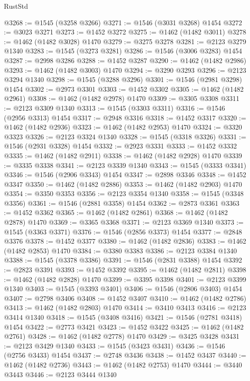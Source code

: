 \begin{lexlean}{RustStd}
\begin{coremodule}
@3268 := @1545 (@3258 @3266)
@3271 := @1546 (@3031 @3268) @1454
@3272 := @3023 @3271
@3273 := @1452 @3272
@3275 := @1462 (@1482 @3011)
@3278 := @1462 (@1482 @3028) @1470
@3279 := @3275 @3278
@3281 := @2123 @3279 @1340
@3283 := @1545 (@3273 @3281)
@3286 := @1546 (@3006 @3283) @1454
@3287 := @2998 @3286
@3288 := @1452 @3287
@3290 := @1462 (@1482 @2986)
@3293 := @1462 (@1482 @3003) @1470
@3294 := @3290 @3293
@3296 := @2123 @3294 @1340
@3298 := @1545 (@3288 @3296)
@3301 := @1546 (@2981 @3298) @1454
@3302 := @2973 @3301
@3303 := @1452 @3302
@3305 := @1462 (@1482 @2961)
@3308 := @1462 (@1482 @2978) @1470
@3309 := @3305 @3308
@3311 := @2123 @3309 @1340
@3313 := @1545 (@3303 @3311)
@3316 := @1546 (@2956 @3313) @1454
@3317 := @2948 @3316
@3318 := @1452 @3317
@3320 := @1462 (@1482 @2936)
@3323 := @1462 (@1482 @2953) @1470
@3324 := @3320 @3323
@3326 := @2123 @3324 @1340
@3328 := @1545 (@3318 @3326)
@3331 := @1546 (@2931 @3328) @1454
@3332 := @2923 @3331
@3333 := @1452 @3332
@3335 := @1462 (@1482 @2911)
@3338 := @1462 (@1482 @2928) @1470
@3339 := @3335 @3338
@3341 := @2123 @3339 @1340
@3343 := @1545 (@3333 @3341)
@3346 := @1546 (@2906 @3343) @1454
@3347 := @2898 @3346
@3348 := @1452 @3347
@3350 := @1462 (@1482 @2886)
@3353 := @1462 (@1482 @2903) @1470
@3354 := @3350 @3353
@3356 := @2123 @3354 @1340
@3358 := @1545 (@3348 @3356)
@3361 := @1546 (@2881 @3358) @1454
@3362 := @2873 @3361
@3363 := @1452 @3362
@3365 := @1462 (@1482 @2861)
@3368 := @1462 (@1482 @2878) @1470
@3369 := @3365 @3368
@3371 := @2123 @3369 @1340
@3373 := @1545 (@3363 @3371)
@3376 := @1546 (@2856 @3373) @1454
@3377 := @2848 @3376
@3378 := @1452 @3377
@3380 := @1462 (@1482 @2836)
@3383 := @1462 (@1482 @2853) @1470
@3384 := @3380 @3383
@3386 := @2123 @3384 @1340
@3388 := @1545 (@3378 @3386)
@3391 := @1546 (@2831 @3388) @1454
@3392 := @2823 @3391
@3393 := @1452 @3392
@3395 := @1462 (@1482 @2811)
@3398 := @1462 (@1482 @2828) @1470
@3399 := @3395 @3398
@3401 := @2123 @3399 @1340
@3403 := @1545 (@3393 @3401)
@3406 := @1546 (@2806 @3403) @1454
@3407 := @2798 @3406
@3408 := @1452 @3407
@3410 := @1462 (@1482 @2786)
@3413 := @1462 (@1482 @2803) @1470
@3414 := @3410 @3413
@3416 := @2123 @3414 @1340
@3418 := @1545 (@3408 @3416)
@3421 := @1546 (@2781 @3418) @1454
@3422 := @2773 @3421
@3423 := @1452 @3422
@3425 := @1462 (@1482 @2761)
@3428 := @1462 (@1482 @2778) @1470
@3429 := @3425 @3428
@3431 := @2123 @3429 @1340
@3433 := @1545 (@3423 @3431)
@3436 := @1546 (@2756 @3433) @1454
@3437 := @2748 @3436
@3438 := @1452 @3437
@3440 := @1462 (@1482 @2736)
@3443 := @1462 (@1482 @2753) @1470
@3444 := @3440 @3443
@3446 := @2123 @3444 @1340

\end{coremodule}
\end{lexlean}
